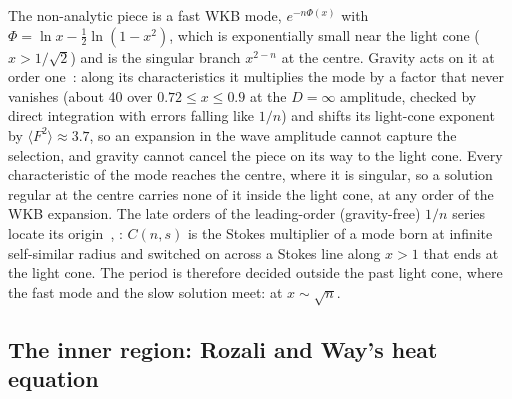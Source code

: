 \documentclass[aps,prd,onecolumn,superscriptaddress,nofootinbib,10pt]{revtex4-2}
\begin{document}
The non-analytic piece is a fast WKB mode, $e^{-n\Phi(x)}$ with $\Phi = \ln x - \tfrac12\ln(1-x^2)$, which is
exponentially small near the light cone ($x > 1/\sqrt2$) and is the singular branch $x^{2-n}$ at the centre. Gravity acts
on it at order one~\cite[Prop.~3]{math}: along its characteristics it multiplies the mode by a factor that never
vanishes (about 40 over $0.72 \le x \le 0.9$ at the $D = \infty$ amplitude, checked by direct integration with errors
falling like $1/n$) and shifts its light-cone exponent by $\langle F^2\rangle \approx 3.7$, so an expansion in the wave
amplitude cannot capture the selection, and gravity cannot cancel the piece on its way to the light cone. Every
characteristic of the mode reaches the centre, where it is singular, so a solution regular at the centre carries none of
it inside the light cone, at any order of the WKB expansion. The late orders of the leading-order (gravity-free) $1/n$
series locate its origin~\cite{Dingle1973}, \cite[Prop.~4]{math}: $C(n,s)$ is the Stokes multiplier of a mode born at infinite self-similar radius and switched
on across a Stokes line along $x > 1$ that ends at the light cone. The period is therefore decided outside the past
light cone, where the fast mode and the slow solution meet: at $x \sim \sqrt n$.

\subsection{The inner region: Rozali and Way's heat equation}
\label{sec:inner}
\end{document}
